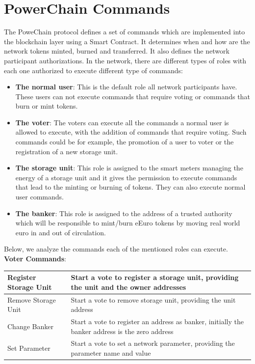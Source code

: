 \section{PowerChain Commands}
The PoweChain protocol defines a set of commands which are implemented into the blockchain layer using a Smart Contract. It determines when and how are the network tokens minted, burned and transferred. 
It also defines the network participant authorizations. In the network, there are different types of roles with each one authorized to execute different type of commands:
\begin{itemize}
    \item \textbf{The normal user}: This is the default role all network participants have. These users can not execute commands that require voting or commands that burn or mint tokens.
    \item \textbf{The voter}: The voters can execute all the commands a normal user is allowed to execute, with the addition of commands that require voting. Such commands could be for example, the promotion of a user to voter
    or the registration of a new storage unit.
    \item \textbf{The storage unit}: This role is assigned to the smart meters managing the energy of a storage unit and it gives the permission to execute commands that lead to the minting or burning of tokens. They
    can also execute normal user commands.
    \item \textbf{The banker}: This role is assigned to the address of a trusted authority which will be responsible to mint/burn eEuro tokens by moving real world euro in and out of circulation.
\end{itemize}
Below, we analyze the commands each of the mentioned roles can execute.\\
\textbf{Voter Commands}:\\
\begin{tabular}{|p{5.5cm}|p{8cm}|}
    \hline
    Register Storage Unit & Start a vote to register a storage unit, providing the unit and the owner addresses \\ \hline
    Remove Storage Unit & Start a vote to remove storage unit, providing the unit address \\ \hline
    Change Banker & Start a vote to register an address as banker, initially the banker address is the zero address \\ \hline
    Set Parameter & Start a vote to set a network parameter, providing the parameter name and value \\ \hline
\end{tabular}\\

